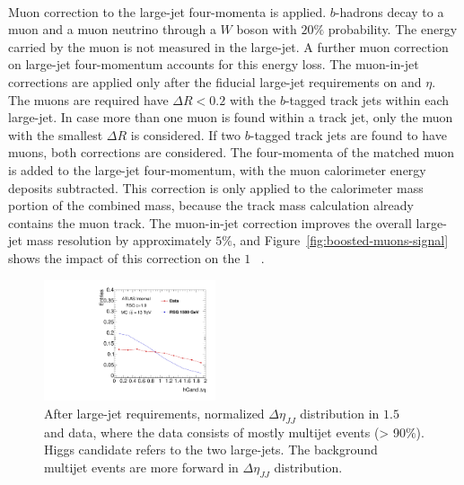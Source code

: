 
\paragraph{}
Muon correction to the large-\R jet four-momenta is applied.
$b$-hadrons decay to a muon and a muon neutrino through a $W$ boson with $20\%$ probability.
The energy carried by the muon is not measured in the large-\R jet.
A further muon correction on large-\R jet four-momentum accounts for this energy loss.
The muon-in-jet corrections are applied only after the fiducial large-\R jet requirements on \pt and $\eta$.
The muons are required have $\Delta R < 0.2$ with the $b$-tagged track jets within each large-\R jet. 
In case more than one muon is found within a track jet, only the muon with the smallest $\Delta R$ is considered. 
If two $b$-tagged track jets are found to have muons, both corrections are considered. 
The four-momenta of the matched muon is added to the large-\R jet four-momentum, with the muon calorimeter energy deposits subtracted. 
This correction is only applied to the calorimeter mass portion of the combined mass, because the track mass calculation already contains the muon track. 
The muon-in-jet correction improves the overall large-\R jet mass resolution by approximately $5\%$, and Figure~\ref{fig:boosted-muons-signal} shows the impact of this correction on the $1$\TeV~ \Grav.

\begin{figure}
\begin{center}
  \includegraphics[width=0.45\textwidth,angle=-90]{figures/boosted/Other/AllTag_Signal_hCandDeta_F_c10-cb-no-deta-cut_truth_0.pdf}
  \caption{ After large-\R jet requirements, normalized $\Delta \eta_{JJ}$ distribution in $1.5$ \TeV \Grav~ and data, where the data consists of mostly multijet events (> 90$\%$). Higgs candidate refers to the two large-\R jets. The background multijet events are more forward in $\Delta \eta_{JJ}$ distribution.}
\label{fig:app-check-deta}
\end{center}
\end{figure}

